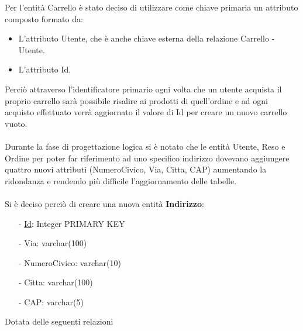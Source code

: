\documentclass[11pt]{article}
\begin{document}
Per l'entità Carrello è stato deciso di utilizzare come chiave primaria un attributo composto formato da:
\begin{itemize}
    \item L'attributo Utente, che è anche chiave esterna della relazione Carrello - Utente.
    \item L'attributo Id.
\end{itemize}
Perciò attraverso l'identificatore primario ogni volta che un utente acquista il proprio carrello sarà
possibile risalire ai prodotti di quell'ordine e ad ogni acquisto effettuato verrà aggiornato il valore di Id per 
creare un nuovo carrello vuoto.\\\\
Durante la fase di progettazione logica si è notato che le entità Utente, Reso e Ordine per poter far riferimento 
ad uno specifico indirizzo dovevano aggiungere quattro nuovi attributi (NumeroCivico, Via, Citta, CAP) aumentando
la ridondanza e rendendo più difficile l'aggiornamento delle tabelle.\\\\
Si è deciso perciò di creare una nuova entità \textbf{Indirizzo}:
\begin{itemize}
    \item[-] \underline{Id}: Integer PRIMARY KEY
    \item[-] Via: varchar(100)
    \item[-] NumeroCivico: varchar(10)
    \item[-] Citta: varchar(100)
    \item[-] CAP: varchar(5)
\end{itemize}
Dotata delle seguenti relazioni
\end{document}
